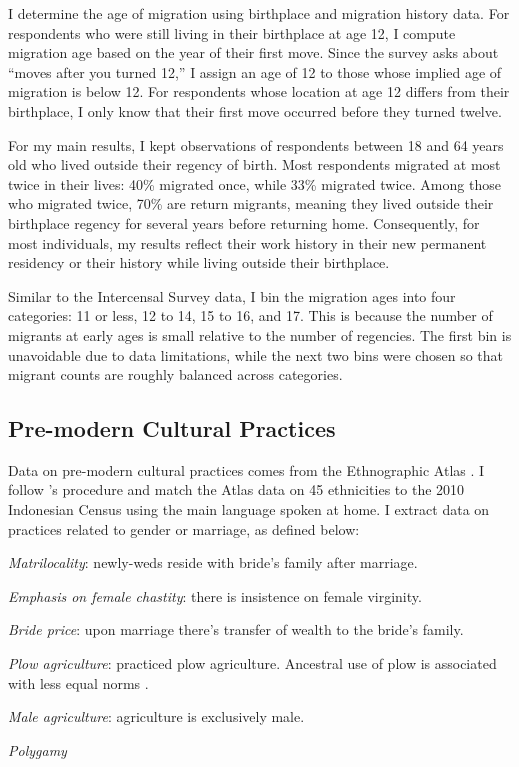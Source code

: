 I determine the age of migration using birthplace and migration history data. For respondents who were still living in their birthplace at age 12, I compute migration age based on the year of their first move. Since the survey asks about ``moves after you turned 12,'' I assign an age of 12 to those whose implied age of migration is below 12. For respondents whose location at age 12 differs from their birthplace, I only know that their first move occurred before they turned twelve.

For my main results, I kept observations of respondents between 18 and 64 years old who lived outside their regency of birth. Most respondents migrated at most twice in their lives: 40\% migrated once, while 33\% migrated twice. Among those who migrated twice, 70\% are return migrants, meaning they lived outside their birthplace regency for several years before returning home. Consequently, for most individuals, my results reflect their work history in their new permanent residency or their history while living outside their birthplace. 

Similar to the Intercensal Survey data, I bin the migration ages into four categories: 11 or less,   12 to 14, 15 to 16, and 17. This is because the number of migrants at early ages is small relative to the number of regencies. The first bin is unavoidable due to data limitations, while the next two bins were chosen so that migrant counts are roughly balanced across categories.

\subsection{Pre-modern Cultural Practices}
\label{sec:eth_atlas}
Data on pre-modern cultural practices comes from the Ethnographic Atlas \citep{Murdock1967}. I follow \cite{Bau}'s procedure and match the Atlas data on 45 ethnicities to the 2010 Indonesian Census using the main language spoken at home. I extract data on practices related to gender or marriage, as defined below:
\bitem
\item \textit{Matrilocality}: newly-weds reside with bride's family after marriage.
\item \textit{Emphasis on female chastity}: there is insistence on female virginity.
\item \textit{Bride price}: upon marriage there's transfer of wealth to the bride's family.
\item \textit{Plow agriculture}: practiced plow agriculture. Ancestral use of plow is associated with less equal norms \citep{AlesinaPaolaGiulianoNathanNunn2013}.
\item \textit{Male agriculture}: agriculture is exclusively male.
\item \textit{Polygamy}
\eitem 

